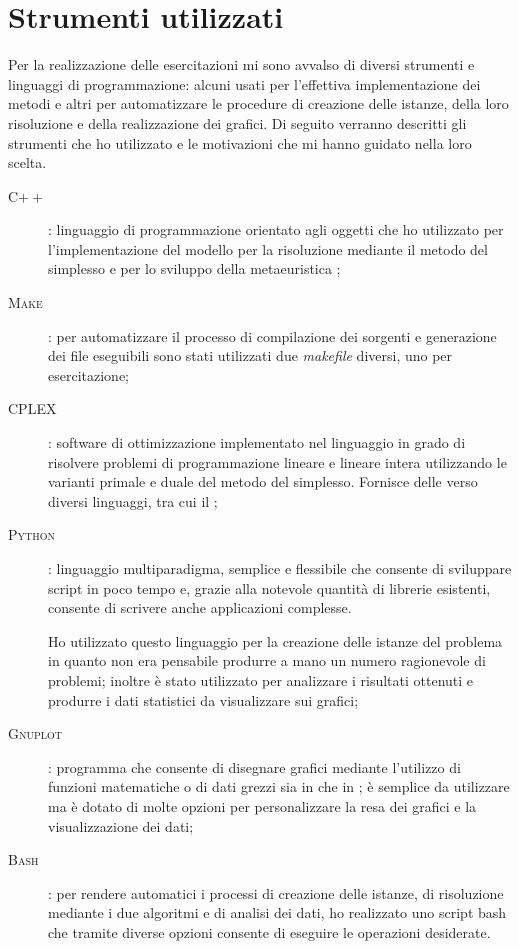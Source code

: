 \section{Strumenti utilizzati}
Per la realizzazione delle esercitazioni mi sono avvalso di diversi strumenti e linguaggi di programmazione: alcuni usati per l'effettiva implementazione dei metodi e altri per automatizzare le procedure di creazione delle istanze, della loro risoluzione e della realizzazione dei grafici.
Di seguito verranno descritti gli strumenti che ho utilizzato e le motivazioni che mi hanno guidato nella loro scelta.

\begin{description}
	\item[\textsc{C$++$}]: linguaggio di programmazione orientato agli oggetti che ho utilizzato per l'implementazione del modello per la risoluzione mediante il metodo del simplesso e per lo sviluppo della metaeuristica \tabu;
	\item[\textsc{Make}]: per automatizzare il processo di compilazione dei sorgenti e generazione dei file eseguibili sono stati utilizzati due \emph{makefile} diversi, uno per esercitazione;
	\item[\textsc{CPLEX}]: software di ottimizzazione implementato nel linguaggio  in grado di risolvere problemi di programmazione lineare e lineare intera utilizzando le varianti primale e duale del metodo del simplesso. Fornisce delle  verso diversi linguaggi, tra cui il ;
	\item[\textsc{Python}]: linguaggio multiparadigma, semplice e flessibile che consente di sviluppare script in poco tempo e, grazie alla notevole quantità di librerie esistenti, consente di scrivere anche applicazioni complesse.
	
	Ho utilizzato questo linguaggio per la creazione delle istanze del problema in quanto non era pensabile produrre a mano un numero ragionevole di problemi; inoltre è stato utilizzato per analizzare i risultati ottenuti e produrre i dati statistici da visualizzare sui grafici;
	\item[\textsc{Gnuplot}]: programma che consente di disegnare grafici mediante l'utilizzo di funzioni matematiche o di dati grezzi sia in  che in ; è semplice da utilizzare ma è dotato di molte opzioni per personalizzare la resa dei grafici e la visualizzazione dei dati;
	\item[\textsc{Bash}]: per rendere automatici i processi di creazione delle istanze, di risoluzione mediante i due algoritmi e di analisi dei dati, ho realizzato uno script bash che tramite diverse opzioni consente di eseguire le operazioni desiderate.
\end{description}


